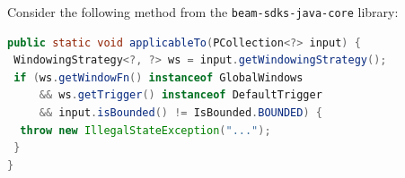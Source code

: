 

Consider the following method from the \texttt{beam-sdks-java-core} library:

\begin{lstlisting}[language=Java,breaklines=true,breakatwhitespace=false,basicstyle=\scriptsize\ttfamily]
public static void applicableTo(PCollection<?> input) {
 WindowingStrategy<?, ?> ws = input.getWindowingStrategy();
 if (ws.getWindowFn() instanceof GlobalWindows
     && ws.getTrigger() instanceof DefaultTrigger
     && input.isBounded() != IsBounded.BOUNDED) {
  throw new IllegalStateException("...");
 }
}
\end{lstlisting}




